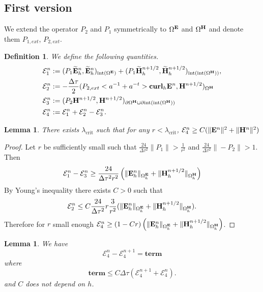 \documentclass[12pt,reqno]{amsart}
\newcommand{\curl}{{\bf curl}}
\newcommand{\e}{{\bf E}}
\newcommand{\h}{{\bf H}}
\newtheorem{lem}[theorem]{Lemma}
\newtheorem{defi}[theorem]{Definition}
\theoremstyle{definition}
\numberwithin{equation}{section}
\newcommand{\intr}[1]{\mathrm{int}(#1)}
\def\Gw{\Omega}     \def\Gx{\Xi}         \def\Gy{\Psi}
\def\Gwh{\Omega_h}
\def\lc{\lambda_\mathrm{crit}}
\begin{document}
\subsection{First version}
		We extend the operator $P_2$ and $P_1$ symmetrically  to $\Gw^{\e}$ and 
$\Gw^{\h}$ and denote them $P_{1,ext}$, $P_{2,ext}$.
\begin{defi}

	We define the following quantities.
	\begin{align*}
		&
		\mathcal{E}_1^{n}:=
		(P_1\widetilde{\e}_h^{n},\widetilde{\e}_h^{n})_{\intr{\Gw^\e}}+
		(P_1\widetilde{\h}_h^{n+1/2},\widetilde{\h}_h^{n+1/2})_{\intr{\intr{\Gw^\h}}}, \\&
		\mathcal{E}_2^{n}:=-\frac{\Delta \tau}{2}(P_{2,ext}<a^{-1}+a^{-t}>\curl_h \e^{n},\h^{n+1/2})_{\Gw^\h}\\&
		\mathcal{E}_3^{n}:=(P_{2}\h^{n+1/2},\h^{n+1/2})_{\partial \Gw^\h\cup \partial \intr{\intr{\Gw^\h}}}\\&
		\mathcal{E}_4^{n}:=\mathcal{E}^n_1+\mathcal{E}^n_2-\mathcal{E}^n_3.
	\end{align*}
\end{defi}
\begin{lem}
	There exists $\lc$ such that for any $r<\lc$, 
	$\mathcal{E}_4^n\geq C(\|\e^n\|^2+\|\h^n\|^2) $
\end{lem}
\begin{proof}
Let $r$ be sufficiently small such that $\frac{24}{\Delta \tau^2}\|P_1\|>\frac{1}{r^2}$
and $\frac{24}{\Delta \tau^2}\|-P_2\|>1$.
Then $$\mathcal{E}_1^n-\mathcal{E}_3^n\geq
\frac{24}{\Delta \tau^2r^2}\left ( \|\e_h^n\|_{\Gwh^\e}+\|\h_h^{n+1/2}\|_{\Gwh^\h}\right)$$
By Young's inequality there exists $C>0$ such that 
$$
\mathcal{E}_2^n\leq C\frac{24}{\Delta \tau^2}r\frac{3}{r^2}(\|\e_h^n\|_{\Gwh^\e}+\|\h_h^{n+1/2}\|_{\Gwh^\h}).
$$
Therefore for $r$ small enough $\mathcal{E}_4^n\geq (1-Cr)\left ( \|\e_h^n\|_{\Gwh^\e}+\|\h_h^{n+1/2}\|_{\Gwh^\h}\right)$.
\end{proof}
\begin{lem} We have
	$$\mathcal{E}_4^n-
\mathcal{E}_4^{n+1}=
\mathbf{term}
$$
where 
$$
\mathbf{term}\leq C \Delta \tau(\mathcal{E}_4^{n+1}+\mathcal{E}_4^{n}).
$$
and $C$ does not depend on $h$.
\end{lem}
\end{document}
